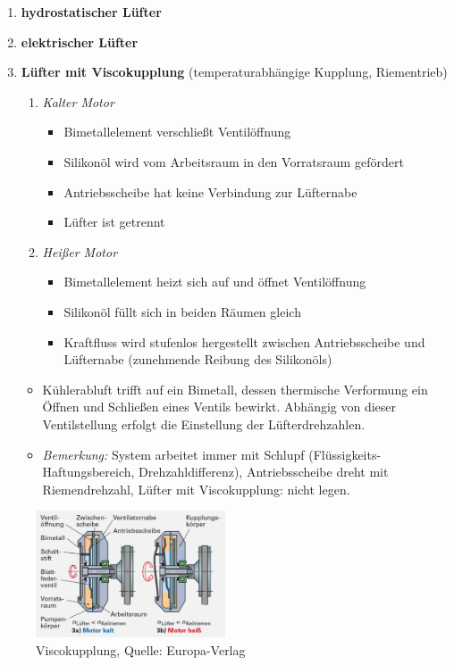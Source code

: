 \begin{enumerate}
\item
  \textbf{hydrostatischer Lüfter}
\item
  \textbf{elektrischer Lüfter}
\item
  \textbf{Lüfter mit Viscokupplung} (temperaturabhängige Kupplung,
  Riementrieb)

  \begin{enumerate}
  \def\labelenumii{\arabic{enumii}.}
  \item
    \emph{Kalter Motor}

    \begin{itemize}
    \item
      Bimetallelement verschließt Ventilöffnung
    \item
      Silikonöl wird vom Arbeitsraum in den Vorratsraum gefördert
    \item
      Antriebsscheibe hat keine Verbindung zur Lüfternabe
    \item
      Lüfter ist getrennt
    \end{itemize}
  \item
    \emph{Heißer Motor}

    \begin{itemize}
    \item
      Bimetallelement heizt sich auf und öffnet Ventilöffnung
    \item
      Silikonöl füllt sich in beiden Räumen gleich
    \item
      Kraftfluss wird stufenlos hergestellt zwischen Antriebsscheibe und
      Lüfternabe (zunehmende Reibung des Silikonöls)
    \end{itemize}
  \end{enumerate}

  \begin{itemize}
  \item
    Kühlerabluft trifft auf ein Bimetall, dessen thermische Verformung
    ein Öffnen und Schließen eines Ventils bewirkt. Abhängig von dieser
    Ventilstellung erfolgt die Einstellung der Lüfterdrehzahlen.
  \item
    \emph{Bemerkung:} System arbeitet immer mit Schlupf
    (Flüssigkeits-Haftungsbereich, Drehzahldifferenz), Antriebsscheibe
    dreht mit Riemendrehzahl, Lüfter mit Viscokupplung: nicht legen.
  \end{itemize}
\end{enumerate}

\begin{figure}[!ht]%
\centering
\includegraphics[width=0.5\textwidth]{images/Kuehlsystem/Kuehlsystem-3.pdf}
\caption{Viscokupplung, Quelle: Europa-Verlag}
\end{figure}

